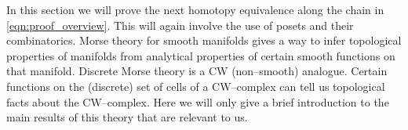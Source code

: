 \documentclass[class=article, crop=false]{standalone}
\begin{document}
In this section we will prove the next homotopy equivalence along the chain in \eqref{eqn:proof_overview}. This will again involve the use of posets and their combinatorics.
Morse theory for smooth manifolds gives a way to infer topological properties of manifolds from analytical properties of certain smooth functions on that manifold. Discrete Morse theory is a CW (non--smooth) analogue. Certain functions on the (discrete) set of cells of a CW--complex can tell us topological facts about the CW--complex. Here we will only give a brief introduction to the main results of this theory that are relevant to us.
\end{document}
